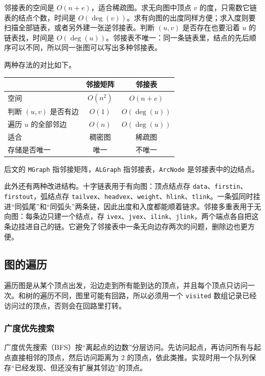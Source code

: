 邻接表的空间是 $O(n+e)$，适合稀疏图。求无向图中顶点 $v$ 的度，只需数它链表的结点个数，时间是 $O(\deg(v))$。求有向图的出度同样方便；求入度则要扫描全部链表，或者另外建一张逆邻接表。判断 $(u,v)$ 是否存在也要沿着 $u$ 的链表找，时间是 $O(\deg(u))$。邻接表不唯一：同一条链表里，结点的先后顺序可以不同，所以同一张图可以写出多种邻接表。

两种存法的对比如下。

\begin{center}
\begin{tabular}{lcc}
\toprule
 & 邻接矩阵 & 邻接表 \\
\midrule
空间 & $O(n^2)$ & $O(n+e)$ \\
判断 $(u,v)$ 是否有边 & $O(1)$ & $O(\deg(u))$ \\
遍历 $u$ 的全部邻边 & $O(n)$ & $O(\deg(u))$ \\
适合 & 稠密图 & 稀疏图 \\
存储是否唯一 & 唯一 & 不唯一 \\
\bottomrule
\end{tabular}
\end{center}

后文的 \texttt{MGraph} 指邻接矩阵，\texttt{ALGraph} 指邻接表，\texttt{ArcNode} 是邻接表中的边结点。

此外还有两种改进结构。十字链表用于有向图：顶点结点存 \texttt{data}、\texttt{firstin}、\texttt{firstout}，弧结点存 \texttt{tailvex}、\texttt{headvex}、\texttt{weight}、\texttt{hlink}、\texttt{tlink}。一条弧同时挂进“同弧尾”和“同弧头”两条链，因此出度和入度都能顺着链求。邻接多重表用于无向图：每条边只建一个结点，存 \texttt{ivex}、\texttt{jvex}、\texttt{ilink}、\texttt{jlink}，两个端点各自把这条边挂进自己的链。它避免了邻接表中一条无向边存两次的问题，删除边也更方便。

\subsection{图的遍历}

遍历图是从某个顶点出发，沿边走到所有能到达的顶点，并且每个顶点只访问一次。和树的遍历不同，图里可能有回路，所以必须用一个 \texttt{visited} 数组记录已经访问过的顶点，否则会在回路里打转。

\subsubsection{广度优先搜索}

广度优先搜索（BFS）按“离起点的边数”分层访问。先访问起点，再访问所有与起点直接相邻的顶点，然后访问距离为 2 的顶点，依此类推。实现时用一个队列保存“已经发现、但还没有扩展其邻边”的顶点。

